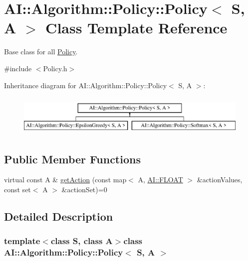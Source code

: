 \hypertarget{classAI_1_1Algorithm_1_1Policy_1_1Policy}{\section{A\+I\+:\+:Algorithm\+:\+:Policy\+:\+:Policy$<$ S, A $>$ Class Template Reference}
\label{classAI_1_1Algorithm_1_1Policy_1_1Policy}
}


Base class for all \hyperlink{classAI_1_1Algorithm_1_1Policy_1_1Policy}{Policy}.  




{\ttfamily \#include $<$Policy.\+h$>$}

Inheritance diagram for A\+I\+:\+:Algorithm\+:\+:Policy\+:\+:Policy$<$ S, A $>$\+:\begin{figure}[H]
\begin{center}
\leavevmode
\includegraphics[height=2.000000cm]{classAI_1_1Algorithm_1_1Policy_1_1Policy}
\end{center}
\end{figure}
\subsection*{Public Member Functions}
\begin{DoxyCompactItemize}
\item 
virtual const A \& \hyperlink{classAI_1_1Algorithm_1_1Policy_1_1Policy_a1bd1f511d0f5dce4f4b080232845852c}{get\+Action} (const map$<$ A, \hyperlink{namespaceAI_a41b74884a20833db653dded3918e05c3}{A\+I\+::\+F\+L\+O\+A\+T} $>$ \&action\+Values, const set$<$ A $>$ \&action\+Set)=0
\end{DoxyCompactItemize}


\subsection{Detailed Description}
\subsubsection*{template$<$class S, class A$>$class A\+I\+::\+Algorithm\+::\+Policy\+::\+Policy$<$ S, A $>$}

